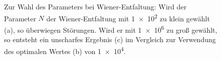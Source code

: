 \begin{figure}
	\centering
	\caption[Wahl des Parameters bei Wiener-Entfaltung]{Zur Wahl des Parameters bei Wiener-Entfaltung: Wird der Parameter $N$ der Wiener-Entfaltung mit \num{1e2} zu klein gewählt (a), so überwiegen Störungen. Wird er mit \num{1e6} zu groß gewählt, so entsteht ein unscharfes Ergebnis (c) im Vergleich zur Verwendung des optimalen Wertes (b) von \num{1e4}.}
	\label{fig:recon3dwienernoise}
\end{figure}
